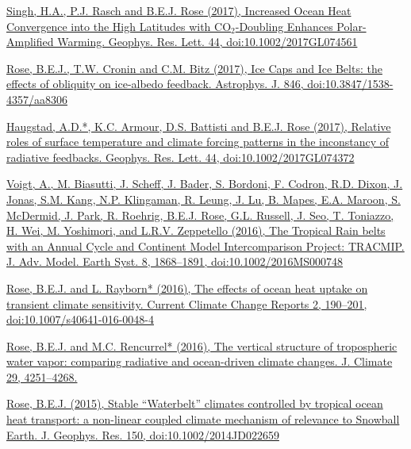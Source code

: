 \documentclass[11pt, letterpaper]{article} %
\newcommand{\years}[1]{\marginnote{\scriptsize #1}} %
\newcommand{\publink}{http://www.atmos.albany.edu/facstaff/brose/resources/Publications/}
\begin{document}
\href{\publink Singh_et_al-2017-Geophysical_Research_Letters-2.pdf}{Singh, H.A., P.J. Rasch and \underline{B.E.J. Rose} (2017), Increased Ocean Heat Convergence into the High Latitudes with CO$_2$-Doubling Enhances Polar-Amplified Warming. Geophys. Res. Lett. 44, doi:10.1002/2017GL074561}
\vspace{0.2 cm}

\href{\publink Rose_2017_ApJ_846_28.pdf}{\underline{Rose, B.E.J.}, T.W. Cronin and C.M. Bitz (2017), Ice Caps and Ice Belts: the effects of obliquity on ice-albedo feedback. Astrophys. J. 846, doi:10.3847/1538-4357/aa8306}
\vspace{0.2 cm}

\href{\publink Haugstad_et_al-2017-Geophysical_Research_Letters.pdf}{Haugstad, A.D.*, K.C. Armour, D.S. Battisti and \underline{B.E.J. Rose} (2017), Relative roles of surface temperature and climate forcing patterns in the inconstancy of radiative feedbacks. Geophys. Res. Lett. 44, doi:10.1002/2017GL074372}
\vspace{0.2 cm}

\years{2016}
\href{\publink Voigt_et_al-2016-TRACMIP.pdf}{Voigt, A., M. Biasutti, J. Scheff, J. Bader, S. Bordoni, F. Codron, R.D. Dixon, J. Jonas, S.M. Kang, N.P. Klingaman, R. Leung, J. Lu, B. Mapes, E.A. Maroon, S. McDermid, J. Park, R. Roehrig, \underline{B.E.J. Rose}, G.L. Russell, J. Seo, T. Toniazzo, H. Wei, M. Yoshimori, and L.R.V. Zeppetello (2016), The Tropical Rain belts with an Annual Cycle and Continent Model Intercomparison Project: TRACMIP. J. Adv. Model. Earth Syst. 8, 1868--1891, doi:10.1002/2016MS000748}
\vspace{0.2 cm}
 
\href{\publink Rose_Rayborn_CCCR2016.pdf}{\underline{Rose, B.E.J.} and L. Rayborn* (2016), The effects of ocean heat uptake on transient climate sensitivity. Current Climate Change Reports 2, 190--201, doi:10.1007/s40641-016-0048-4}
\vspace{0.2 cm}
   
\href{\publink Rose_Rencurrel_JClim2016.pdf}{\underline{Rose, B.E.J.} and M.C. Rencurrel* (2016), The vertical structure of tropospheric water vapor: comparing radiative and ocean-driven climate changes. J. Climate 29, 4251--4268.}
\vspace{0.2 cm}
 
\years{2015}  
\href{\publink Rose_JGR2015.pdf}{\underline{Rose, B.E.J.} (2015), Stable ``Waterbelt'' climates controlled by tropical ocean heat transport: a non-linear coupled climate mechanism of relevance to Snowball Earth. J. Geophys. Res. 150, doi:10.1002/2014JD022659}
\vspace{0.2 cm}
 
\end{document}
